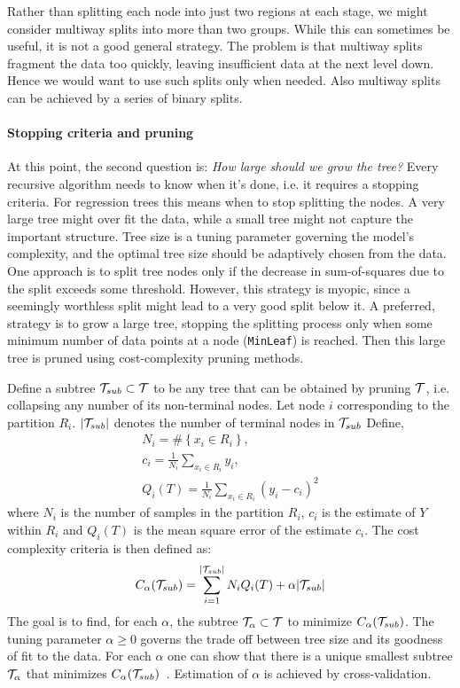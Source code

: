 \textcolor[rgb]{0,0,1}{
Rather than splitting each node into just two regions at each stage, we might consider multiway splits into more than two groups. 
While this can sometimes be useful, it is not a good general strategy. The problem is that multiway splits fragment the data too quickly, leaving insufficient data at the next level down. 
Hence we would want to use such splits only when needed. 
Also multiway splits can be achieved by a series of binary splits.}

\textcolor[rgb]{0,0,1}{
\paragraph{\textbf{Stopping criteria and pruning}}
At this point, the second question is: \emph{How large should we grow the tree?}
Every recursive algorithm needs to know when it's done, i.e. it requires a stopping criteria. 
For regression trees this means when to stop splitting the nodes. 
A very large tree might over fit the data, while a small tree might not capture the important structure.
Tree size is a tuning parameter governing the model’s complexity, and the optimal tree size should be adaptively chosen from the data. 
One approach is to split tree nodes only if the decrease in sum-of-squares due to the split exceeds some threshold. 
However, this strategy is myopic, since a seemingly worthless split might lead to a very good split below it.
A preferred, strategy is to grow a large tree, stopping the splitting process only when some minimum number of data points at a node (\texttt{MinLeaf}) is reached. Then this large tree is pruned using cost-complexity pruning methods.}

\textcolor[rgb]{0,0,1}{
Define a subtree $\mathcal{T}_{sub} \subset \mathcal{T}$ to be any tree that can be obtained by pruning $\mathcal{T}$, i.e. collapsing any number of its non-terminal nodes. 
Let node $i$ corresponding to the partition $R_i$. $|\mathcal{T}_{sub}|$ denotes the number of terminal nodes in $\mathcal{T}_{sub}$
Define,
\begin{equation}
\begin{aligned}
N_i = \# \left\lbrace x_i \in R_i \right\rbrace,\\
c_i = \frac{1}{N_i} \sum_{x_i \in R_i} y_i, \\
Q_i(T) = \frac{1}{N_i} \sum_{x_i \in R_i} (y_i - c_i)^2
\end{aligned}
\end{equation}
where $N_i$ is the number of samples in the partition $R_i$, $c_i$ is the estimate of $Y$ within $R_i$ and $Q_i(T)$ is the mean square error of the estimate $c_i$. The cost complexity criteria is then defined as:
\begin{equation}
C_{\alpha}(\mathcal{T}_{sub}) = \sum_{i=1}^{|\mathcal{T}_{sub}|} N_i Q_i(T) + \alpha |\mathcal{T}_{sub}|
\end{equation}
The goal is to find, for each $\alpha$, the subtree $\mathcal{T}_{\alpha} \subset \mathcal{T}$ to minimize $C_{\alpha}(\mathcal{T}_{sub})$. 
The tuning parameter $\alpha \geq 0$ governs the trade off between tree size and its goodness of fit to the data.
For each $\alpha$ one can show that there is a unique smallest subtree $\mathcal{T}_{\alpha}$ that minimizes $C_{\alpha}(\mathcal{T}_{sub})$~\cite{Ripley96}. Estimation of $\alpha$ is achieved by cross-validation.}